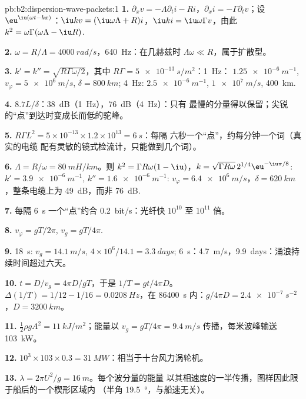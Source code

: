\begin{solution}{pb:b2:dispersion-wave-packets:1}
\textbf{1.} $\partial_xv = -\Lambda\partial_ti - Ri$，$\partial_xi = -\Gamma\partial_tv$；设
$\eu^{\iu(\omega t - kx)}$：$\iu kv = (\iu\omega\Lambda + R)i$，$\iu ki = \iu\omega\Gamma v$，由此
$k^2 = \omega\Gamma(\omega\Lambda - \iu R)$.

\textbf{2.} $\omega = R/\Lambda = \qty{4000}{rad/s}$，\qty{640}{Hz}：在几赫兹时 $\Lambda\omega
\ll R$，属于扩散型。

\textbf{3.} $k' = k'' = \sqrt{R\Gamma\omega/2}$，其中 $R\Gamma = \qty{5e-13}{s/m^2}$：\qty{1}{Hz}：
$\qty{1.25e-6}{m^{-1}}$, $v_\varphi = \qty{5e6}{m/s}$, $\delta = \qty{800}{km}$; \qty{4}{Hz}:
$\qty{2.5e-6}{m^{-1}}$, $\qty{1e7}{m/s}$, \qty{400}{km}.

\textbf{4.} $8.7L/\delta$：\qty{38}{dB}（\qty{1}{Hz}），\qty{76}{dB}（\qty{4}{Hz}）：只有
最慢的分量得以保留；尖锐的“点”到达时变成长而低的驼峰。

\textbf{5.} $R\Gamma L^2 = 5 \times 10^{-13} \times 1.2 \times 10^{13} = \qty{6}{s}$：每隔
六秒一个“点”，约每分钟一个词（真实的电缆
配有灵敏的镜式检流计，只能做到几个词）。

\textbf{6.} $\Lambda = R/\omega = \qty{80}{mH/km}$。则 $k^2 = \Gamma R\omega(1 - \iu)$，$k = \sqrt{\Gamma R\omega}
\,2^{1/4}\eu^{-\iu\pi/8}$: $k' = \qty{3.9e-6}{m^{-1}}$, $k'' = \qty{1.6e-6}{m^{-1}}$: $v_\varphi =
\qty{6.4e6}{m/s}$，$\delta = \qty{620}{km}$，整条电缆上为 \qty{49}{dB}，而非
\qty{76}{dB}.

\textbf{7.} 每隔 \qty{6}{s} 一个“点”约合 \qty{0.2}{bit/s}：光纤快
$10^{10}$ 至 $10^{11}$ 倍。

\textbf{8.} $v_\varphi = gT/2\pi$, $v_g = gT/4\pi$.

\textbf{9.} \qty{18}{s}: $v_g = \qty{14.1}{m/s}$, $4 \times 10^6/14.1 = \qty{3.3}{days}$;
\qty{6}{s}：\qty{4.7}{m/s}，\qty{9.9}{days}：涌浪持续时间超过六天。

\textbf{10.} $t = D/v_g = 4\pi D/gT$，于是 $1/T = gt/4\pi D$。$\Delta(1/T) = 1/12 - 1/16
= \qty{0.0208}{Hz}$，在 \qty{86400}{s} 内：$g/4\pi D = \qty{2.4e-7}{s^{-2}}$，$D = \qty{3200}{km}$。

\textbf{11.} $\tfrac12\rho gA^2 = \qty{11}{kJ/m^2}$；能量以 $v_g = gT/4\pi =
\qty{9.4}{m/s}$ 传播，每米波峰输送 \qty{103}{kW}。

\textbf{12.} $10^3 \times 103 \times 0.3 = \qty{31}{MW}$：相当于十台风力涡轮机。

\textbf{13.} $\lambda = 2\pi U^2/g = \qty{16}{m}$。每个波分量的能量
以其相速度的一半传播，图样因此限于船后的一个楔形区域内
（半角 \qty{19.5}{\degree}，与船速无关）。


\end{solution}
